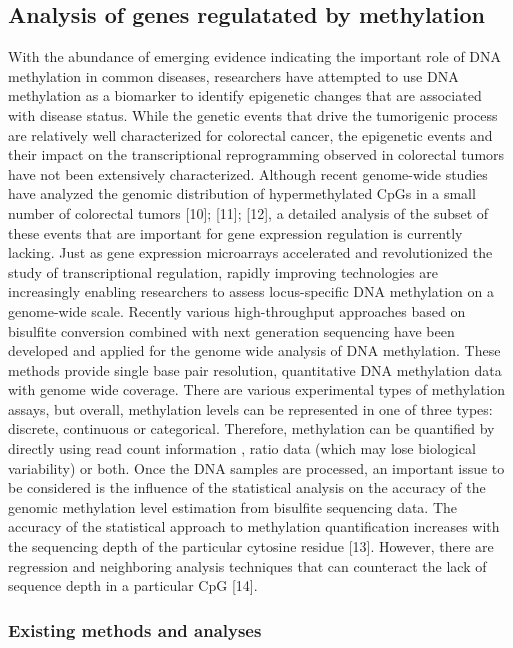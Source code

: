 \documentclass[10pt,letterpaper]{article}
\begin{document}
\hypertarget{analysis-of-genes-regulatated-by-methylation}{%
\subsection{Analysis of genes regulatated by
methylation}\label{analysis-of-genes-regulatated-by-methylation}}

With the abundance of emerging evidence indicating the important role of
DNA methylation in common diseases, researchers have attempted to use
DNA methylation as a biomarker to identify epigenetic changes that are
associated with disease status. While the genetic events that drive the
tumorigenic process are relatively well characterized for colorectal
cancer, the epigenetic events and their impact on the transcriptional
reprogramming observed in colorectal tumors have not been extensively
characterized. Although recent genome-wide studies have analyzed the
genomic distribution of hypermethylated CpGs in a small number of
colorectal tumors {[}10{]}; {[}11{]}; {[}12{]}, a detailed analysis of the 
subset of these events that are important for gene expression regulation is 
currently lacking. Just as gene expression microarrays accelerated and
revolutionized the study of transcriptional regulation, rapidly
improving technologies are increasingly enabling researchers to assess
locus-specific DNA methylation on a genome-wide scale. Recently various
high-throughput approaches based on bisulfite conversion combined with
next generation sequencing have been developed and applied for the
genome wide analysis of DNA methylation. These methods provide single
base pair resolution, quantitative DNA methylation data with genome wide
coverage. There are various experimental types of methylation assays,
but overall, methylation levels can be represented in one of three
types: discrete, continuous or categorical. Therefore, methylation can
be quantified by directly using read count information , ratio data
(which may lose biological variability) or both. Once the DNA samples
are processed, an important issue to be considered is the influence of
the statistical analysis on the accuracy of the genomic methylation
level estimation from bisulfite sequencing data. The accuracy of the
statistical approach to methylation quantification increases with the
sequencing depth of the particular cytosine residue {[}13{]}. However,
there are regression and neighboring analysis techniques that can
counteract the lack of sequence depth in a particular CpG {[}14{]}.

\hypertarget{existing-methods-and-analyses}{%
\subsubsection{Existing methods and
analyses}\label{existing-methods-and-analyses}}
\end{document}
